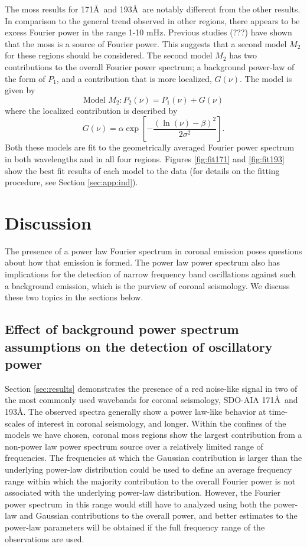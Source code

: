 \documentclass[preprint]{../aastex52/aastex}
\newcommand{\PS}{power spectrum}
\newcommand{\Fps}{Fourier \PS}
\begin{document}
The moss results for 171\AA\ and 193\AA\ are notably different from
the other results.  In comparison to the general trend observed in
other regions, there appears to be excess Fourier power in the range
1-10 mHz.  Previous studies (???) have shown that the moss is a source
of Fourier power.  This suggests that a second model $M_{2}$ for these
regions should be considered.  The second model $M_{2}$ has two
contributions to the overall \Fps; a background power-law of the form
of $P_{1}$, and a contribution that is more localized, $G(\nu)$.  The
model is given by
\begin{equation}
\label{eq:pwrlawbump}
\mbox{Model $M_{2}$}: P_{2}(\nu) = P_{1}(\nu) + G(\nu)
\end{equation}
where the localized contribution is described by
\begin{equation}
\label{eqn:bump}
G(\nu) = \alpha\exp\left[-\frac{(\ln(\nu)-\beta)^{2}}{2\sigma^{2}}\right].
\end{equation}
Both these models are fit to the geometrically averaged Fourier power
spectrum in both wavelengths and in all four regions.  Figures
\ref{fig:fit171} and \ref{fig:fit193} show the best fit results of
each model to the data (for details on the fitting procedure, see
Section \ref{sec:app:ind}).

\section{Discussion}
The presence of a power law Fourier spectrum in coronal emission poses
questions about how that emission is formed.  The power law power
spectrum also has implications for the detection of narrow frequency
band oscillations against such a background emission, which is the
purview of coronal seismology.  We discuss these two topics in the
sections below.


\subsection{Effect of background power spectrum assumptions on the
  detection of oscillatory power}
\label{ssec:corseis}

Section \ref{sec:results} demonstrates the presence of a red
noise-like signal in two of the most commonly used wavebands for
coronal seismology, SDO-AIA 171\AA\ and 193\AA.  The observed spectra
generally show a power law-like behavior at time-scales of interest in
coronal seismology, and longer.  Within the confines of the models we
have chosen, coronal moss regions show the largest contribution from a
non-power law power spectrum source over a relatively limited range of
frequencies.  The frequencies at which the Gaussian contribution is
larger than the underlying power-law distribution could be used to
define an average frequency range within which the majority
contribution to the overall Fourier power is not associated with the
underlying power-law distribution.  However, the \Fps\ in this range
would still have to analyzed using both the power-law and Gaussian
contributions to the overall power, and better estimates to the
power-law parameters will be obtained if the full frequency range of
the observations are used.
\end{document}
